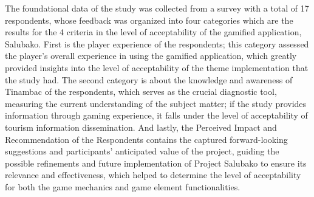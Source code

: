 \documentclass{research}
\begin{document}
The foundational data of the study was collected from a survey with a total of 17
respondents, whose feedback was organized into four categories which are the results for
the 4 criteria in the level of acceptability of the gamified application, Salubako.
First is the player experience of the respondents; this category assessed the player's
overall experience in using the gamified application, which greatly provided insights
into the level of acceptability of the theme implementation that the study had. The
second category is about the knowledge and awareness of Tinambac of the respondents,
which serves as the crucial diagnostic tool, measuring the current understanding of the
subject matter; if the study provides information through gaming experience, it falls
under the level of acceptability of tourism information dissemination. And lastly, the
Perceived Impact and Recommendation of the Respondents contains the captured
forward-looking suggestions and participants' anticipated value of the project, guiding
the possible refinements and future implementation of Project Salubako to ensure its
relevance and effectiveness, which helped to determine the level of acceptability for
both the game mechanics and game element functionalities.


\end{document}
